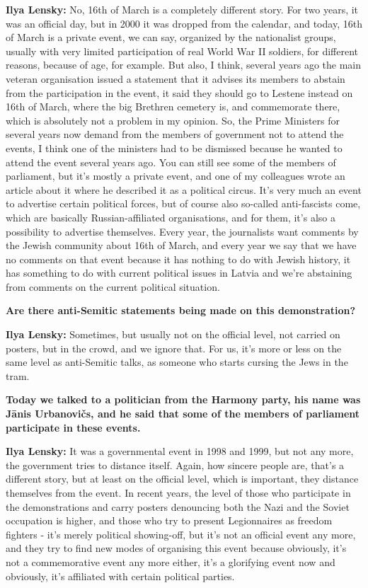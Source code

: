 \textbf{Ilya Lensky:} No, 16th of March is a completely different story. For two years, it was an official day, but in 2000 it was dropped from the calendar, and today, 16th of March is a private event, we can say, organized by the nationalist groups, usually with very limited participation of real World War II soldiers, for different reasons, because of age, for example. But also, I think, several years ago the main veteran organisation issued a statement that it advises its members to abstain from the participation in the event, it said they should go to Lestene instead  on 16th of March, where the big Brethren cemetery is, and commemorate there, which is absolutely not a problem in my opinion. So, the Prime Ministers for several years now demand from the members of government not to attend the events, I think one of the ministers had to be dismissed because he wanted to attend the event several years ago. You can still see some of the members of parliament, but it’s mostly a private event, and one of my colleagues wrote an article about it where he described it as a political circus. It’s very much an event to advertise certain political forces, but of course also so-called anti-fascists come, which are basically Russian-affiliated organisations, and for them, it’s also a possibility to advertise themselves. Every year, the journalists want comments by the Jewish community about 16th of March, and every year we say that we have no comments on that event because it has nothing to do with Jewish history, it has something to do with current political issues in Latvia and we’re abstaining from comments on the current political situation. 

\textbf{Are there anti-Semitic statements being made on this demonstration?} 

\textbf{Ilya Lensky:} Sometimes, but usually not on the official level, not carried on posters, but in the crowd, and we ignore that. 
For us, it’s more or less on the same level as anti-Semitic talks, as someone who starts cursing the Jews in the tram. 

\textbf{Today we talked to a politician from the Harmony party, his name was Jānis Urbanovičs, and he said that some of the members of parliament participate in these events.} 

\textbf{Ilya Lensky:} It was a governmental event in 1998 and 1999, but not any more, the government tries to distance itself. Again, how sincere people are, that’s a different story, but at least on the official level, which is important, they distance themselves from the event. In recent years, the level of those who participate in the demonstrations and carry posters denouncing both the Nazi and the Soviet occupation  is higher, and those who try to present Legionnaires as freedom fighters - it’s merely political showing-off, but it’s not an official event any more, and they try to find new modes of organising this event because obviously, it’s not a commemorative event any more either, it’s a glorifying event now and obviously, it’s affiliated with certain political parties. 

